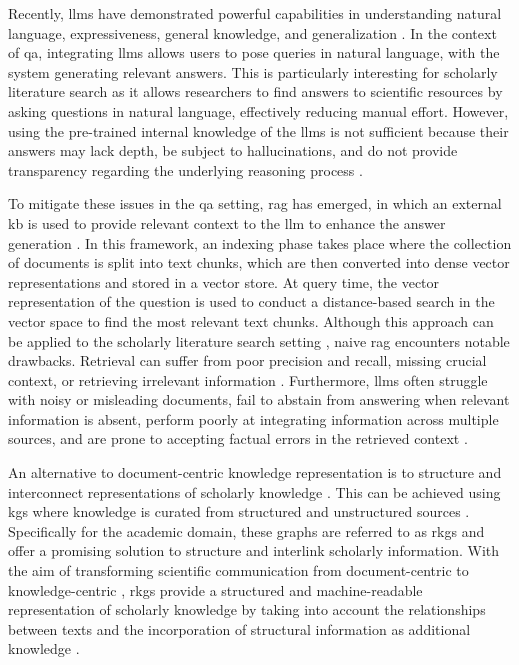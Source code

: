 Recently, \glspl{llm} have demonstrated powerful capabilities in understanding natural language, expressiveness, general knowledge, and generalization \cite{yang_give_2024}. In the context of \gls{qa}, integrating \glspl{llm} allows users to pose queries in natural language, with the system generating relevant answers. This is particularly interesting for scholarly literature search as it allows researchers to find answers to scientific resources by asking questions in natural language, effectively reducing manual effort. However, using the pre-trained internal knowledge of the \glspl{llm} is not sufficient because their answers may lack depth, be subject to hallucinations, and do not provide transparency regarding the underlying reasoning process \cite{yang_give_2024}. 

To mitigate these issues in the \gls{qa} setting, \gls{rag} has emerged, in which an external \gls{kb} is used to provide relevant context to the \gls{llm} to enhance the answer generation \cite{lewis_retrieval-augmented_2021}. In this framework, an indexing phase takes place where the collection of documents is split into text chunks, which are then converted into dense vector representations and stored in a vector store. At query time, the vector representation of the question is used to conduct a distance-based search in the vector space to find the most relevant text chunks. Although this approach can be applied to the scholarly literature search setting \cite{lu_dense_2024}, naive \gls{rag} encounters notable drawbacks. Retrieval can suffer from poor precision and recall, missing crucial context, or retrieving irrelevant information \cite{gao_retrieval-augmented_2024}. Furthermore, \glspl{llm} often struggle with noisy or misleading documents, fail to abstain from answering when relevant information is absent, perform poorly at integrating information across multiple sources, and are prone to accepting factual errors in the retrieved context \cite{chen_benchmarking_2023}.

An alternative to document-centric knowledge representation is to structure and interconnect representations of scholarly knowledge \cite{jaradeh_open_2019-1}. This can be achieved using \glspl{kg} where knowledge is curated from structured and unstructured sources \cite{verma_scholarly_2023}. Specifically for the academic domain, these graphs are referred to as \glspl{rkg} and offer a promising solution to structure and interlink scholarly information. With the aim of transforming scientific communication from document-centric to knowledge-centric \cite{auer_towards_2018}, \glspl{rkg} provide a structured and machine-readable representation of scholarly knowledge by taking into account the relationships between texts and the incorporation of structural information as additional knowledge \cite{peng_graph_2024}.

